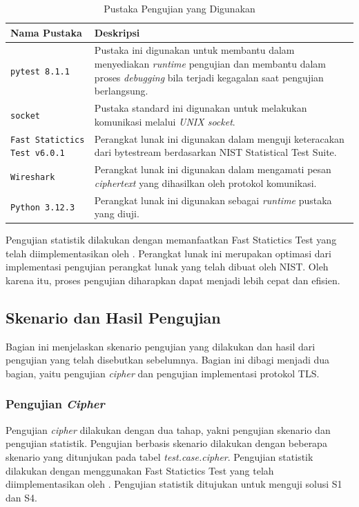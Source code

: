 \begin{table}[!h]
  \centering
  \caption{Pustaka Pengujian yang Digunakan} \label{tab:test.lib}
  \begin{tabular}{|p{4cm}|p{9cm}|}
    \hline
    \textbf{Nama Pustaka} & \textbf{Deskripsi} \\ \hline
    \texttt{pytest 8.1.1} & Pustaka ini digunakan untuk membantu dalam menyediakan \emph{runtime} pengujian dan membantu dalam proses \emph{debugging} bila terjadi kegagalan saat pengujian berlangsung. \\ \hline
    \texttt{socket} & Pustaka standard ini digunakan untuk melakukan komunikasi melalui \emph{UNIX socket}.\\ \hline
    \texttt{Fast Statictics Test v6.0.1} & Perangkat lunak ini digunakan dalam menguji keteracakan dari bytestream berdasarkan NIST Statistical Test Suite.\\ \hline
    \texttt{Wireshark} & Perangkat lunak ini digunakan dalam mengamati pesan \emph{ciphertext} yang dihasilkan oleh protokol komunikasi.\\ \hline
    \texttt{Python 3.12.3} & Perangkat lunak ini digunakan sebagai \emph{runtime} pustaka yang diuji.\\ \hline
    \end{tabular}
  \end{table}
    

  Pengujian statistik dilakukan dengan memanfaatkan Fast Statictics Test yang telah diimplementasikan oleh \textcite{marek2016}. Perangkat lunak ini merupakan optimasi dari implementasi pengujian perangkat lunak yang telah dibuat oleh NIST. Oleh karena itu, proses pengujian diharapkan dapat menjadi lebih cepat dan efisien. 

\subsection{Skenario dan Hasil Pengujian}

Bagian ini menjelaskan skenario pengujian yang dilakukan dan hasil dari pengujian yang telah disebutkan sebelumnya. Bagian ini dibagi menjadi dua bagian, yaitu pengujian \emph{cipher} dan pengujian implementasi protokol TLS.

\subsubsection{Pengujian \emph{Cipher}}

Pengujian \emph{cipher} dilakukan dengan dua tahap, yakni pengujian skenario dan pengujian statistik. Pengujian berbasis skenario dilakukan dengan beberapa skenario yang ditunjukan pada tabel \emph{test.case.cipher}. Pengujian statistik dilakukan dengan menggunakan Fast Statictics Test yang telah diimplementasikan oleh \textcite{marek2016}. Pengujian statistik ditujukan untuk menguji solusi S1 dan S4.

